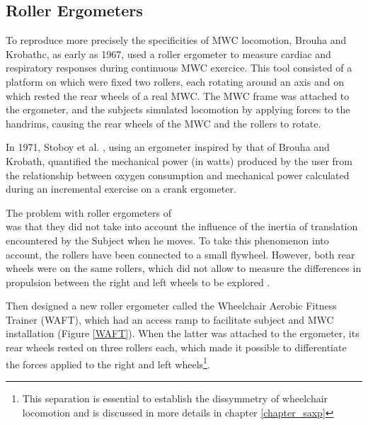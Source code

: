 \subsection{Roller Ergometers}
To reproduce more precisely the specificities of  MWC locomotion, Brouha and Krobathc\cite{brouha1967continuous}, as early as 1967, used a roller ergometer to measure cardiac and respiratory responses during continuous MWC exercice. This tool consisted of a platform on which were fixed two rollers, each rotating around an axis and on which rested the rear wheels of a real MWC. The MWC frame was attached to the ergometer, and the subjects simulated locomotion by applying forces to the handrims, causing the rear wheels of the MWC and the rollers to rotate. 


In 1971, Stoboy et al. \cite{stoboy1971workload}, using an ergometer inspired by that of Brouha and Krobath, quantified the mechanical power (in watts) produced by the user from the relationship between oxygen consumption and mechanical power calculated during an incremental exercise on a crank ergometer.


The problem with roller ergometers of \cite{brouha1967continuous}\\\cite{stoboy1971workload} was that they did not take into account the influence of the inertia of translation encountered by the Subject when he moves. To take this phenomenon into account, the rollers have been connected  to a small flywheel. However,  both rear wheels were on the same rollers, which did not allow to measure the differences in propulsion between the right and left wheels to be explored \cite{brouha1967continuous} \cite{stoboy1971workload}.



Then \cite{langbein1993research} \cite{langbein1993calibration} \cite{langbein1994initial}  designed a new roller ergometer called the Wheelchair Aerobic Fitness Trainer (WAFT), which had an access ramp to facilitate subject and MWC installation (Figure \ref{WAFT}). When the latter was attached to the ergometer, its rear wheels rested on three rollers each, which made it possible to differentiate the forces applied to the right and left wheels\footnote{This separation is essential to establish the dissymmetry of wheelchair locomotion and is discussed in more details in chapter \ref{chapter_saxp}}.

